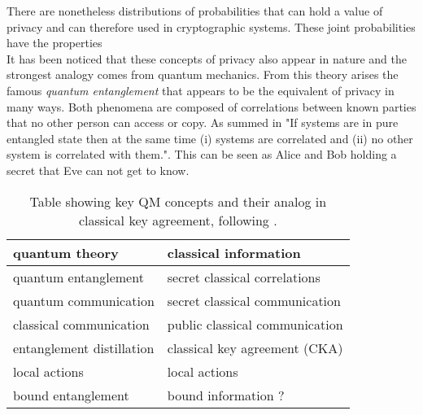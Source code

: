 

There are nonetheless distributions of probabilities that can hold a value of privacy and can therefore used in cryptographic systems. These joint probabilities have the properties
\\

It has been noticed that these concepts of privacy also appear in nature and the strongest analogy comes from quantum mechanics.\footnotemark 
From this theory arises the famous \emph{quantum entanglement} that appears to be the equivalent of privacy in many ways.
Both phenomena are composed of correlations between known parties that no other person can access or copy. As summed in \cite{4H07} "If systems are in pure entangled state then at the same time (i) systems are correlated and (ii) no other system is correlated with them.". 
This can be seen as Alice and Bob holding a secret that Eve can not get to know.
\begin{table}[h]
	 \centering
	 	\begin{tabular}{ l | l}
	 		\textbf{quantum theory} & \textbf{classical information} \\ 
	 		\hline 
	 		quantum entanglement & secret classical correlations \\ 
	 		quantum communication & secret classical communication \\ 
	 		classical communication & public classical communication \\ 
	 		entanglement distillation & classical key agreement (CKA) \\ %
	 		local actions & local actions \\ 
	 		bound entanglement & bound information ? \\
	 	\end{tabular} 
	 	\caption{Table showing key QM concepts and their analog in classical key agreement, following \cite{CP02}.
	 	\label{Tab:analogy}}
	 \end{table}
\\

